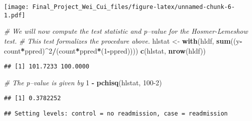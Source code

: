 \documentclass[
]{article}
\newenvironment{Shaded}{\begin{snugshade}}{\end{snugshade}}
\newcommand{\CommentTok}[1]{\textcolor[rgb]{0.56,0.35,0.01}{\textit{#1}}}
\newcommand{\DecValTok}[1]{\textcolor[rgb]{0.00,0.00,0.81}{#1}}
\newcommand{\KeywordTok}[1]{\textcolor[rgb]{0.13,0.29,0.53}{\textbf{#1}}}
\newcommand{\NormalTok}[1]{#1}
\newcommand{\OperatorTok}[1]{\textcolor[rgb]{0.81,0.36,0.00}{\textbf{#1}}}
\newcommand{\StringTok}[1]{\textcolor[rgb]{0.31,0.60,0.02}{#1}}
\begin{document}
\texttt{[image: Final\_Project\_Wei\_Cui\_files/figure-latex/unnamed-chunk-6-1.pdf]}

\begin{Shaded}
\begin{Highlighting}[]
\CommentTok{# We will now compute the test statistic and p–value for the Hosmer-Lemeshow test. }
\CommentTok{# This test formalizes the procedure above.}
\NormalTok{hlstat <-}\StringTok{ }\KeywordTok{with}\NormalTok{(hldf, }\KeywordTok{sum}\NormalTok{((y}\OperatorTok{-}\NormalTok{count}\OperatorTok{*}\NormalTok{ppred)}\OperatorTok{^}\DecValTok{2}\OperatorTok{/}\NormalTok{(count}\OperatorTok{*}\NormalTok{ppred}\OperatorTok{*}\NormalTok{(}\DecValTok{1}\OperatorTok{-}\NormalTok{ppred)))) }
\KeywordTok{c}\NormalTok{(hlstat, }\KeywordTok{nrow}\NormalTok{(hldf))}
\end{Highlighting}
\end{Shaded}

\begin{verbatim}
## [1] 101.7233 100.0000
\end{verbatim}

\begin{Shaded}
\begin{Highlighting}[]
\CommentTok{# The p–value is given by}
\DecValTok{1} \OperatorTok{-}\StringTok{ }\KeywordTok{pchisq}\NormalTok{(hlstat, }\DecValTok{100-2}\NormalTok{)}
\end{Highlighting}
\end{Shaded}

\begin{verbatim}
## [1] 0.3782252
\end{verbatim}

\begin{Shaded}
\end{Shaded}

\begin{verbatim}
## Setting levels: control = no readmission, case = readmission
\end{verbatim}
\end{document}
